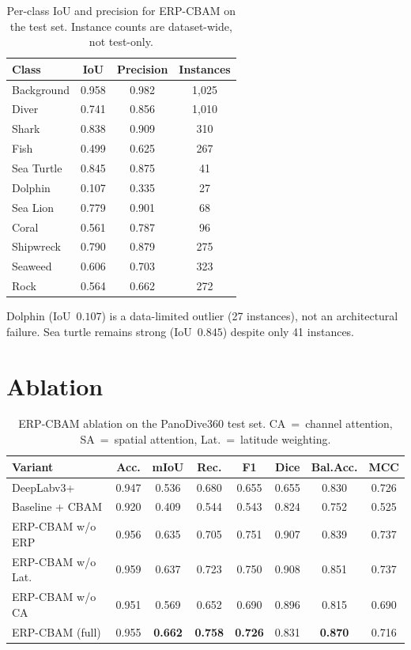 \documentclass[11pt,a4paper]{article}
\begin{document}
\begin{table}[t]
\centering
\caption{Per-class IoU and precision for ERP-CBAM on the test set.
Instance counts are dataset-wide, not test-only.}
\label{tab:perclass}
\begin{tabular}{lccc}
\toprule
\textbf{Class} & \textbf{IoU} & \textbf{Precision} & \textbf{Instances} \\
\midrule
Background & 0.958 & 0.982 & 1{,}025 \\
Diver      & 0.741 & 0.856 & 1{,}010 \\
Shark      & 0.838 & 0.909 & 310 \\
Fish       & 0.499 & 0.625 & 267 \\
Sea Turtle & 0.845 & 0.875 & 41 \\
Dolphin    & 0.107 & 0.335 & 27 \\
Sea Lion   & 0.779 & 0.901 & 68 \\
Coral      & 0.561 & 0.787 & 96 \\
Shipwreck  & 0.790 & 0.879 & 275 \\
Seaweed    & 0.606 & 0.703 & 323 \\
Rock       & 0.564 & 0.662 & 272 \\
\bottomrule
\end{tabular}
\end{table}

Dolphin (IoU~$0.107$) is a data-limited outlier (27 instances), not an
architectural failure.
Sea turtle remains strong (IoU~$0.845$) despite only 41 instances.

\section{Ablation}
\label{sec:ablation}

\begin{table}[t]
\centering
\caption{ERP-CBAM ablation on the PanoDive360 test set.
CA~=~channel attention, SA~=~spatial attention, Lat.~=~latitude
weighting.}
\label{tab:ablation}
\scriptsize
\begin{tabular}{lccccccc}
\toprule
Variant & Acc. & mIoU & Rec. & F1 & Dice & Bal.Acc. & MCC \\
\midrule
DeepLabv3+              & 0.947 & 0.536 & 0.680 & 0.655 & 0.655 & 0.830 & 0.726 \\
Baseline + CBAM         & 0.920 & 0.409 & 0.544 & 0.543 & 0.824 & 0.752 & 0.525 \\
ERP-CBAM w/o ERP        & 0.956 & 0.635 & 0.705 & 0.751 & 0.907 & 0.839 & 0.737 \\
ERP-CBAM w/o Lat.       & 0.959 & 0.637 & 0.723 & 0.750 & 0.908 & 0.851 & 0.737 \\
ERP-CBAM w/o CA         & 0.951 & 0.569 & 0.652 & 0.690 & 0.896 & 0.815 & 0.690 \\
ERP-CBAM (full)         & 0.955 & \textbf{0.662} & \textbf{0.758} & \textbf{0.726}
                        & 0.831 & \textbf{0.870} & 0.716 \\
\bottomrule
\end{tabular}
\end{table}
\end{document}
